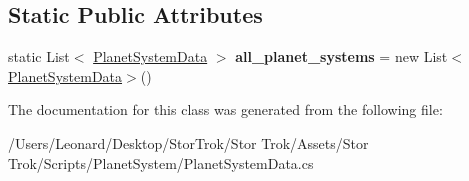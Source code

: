 \subsection*{Static Public Attributes}
\begin{DoxyCompactItemize}
\item 
\mbox{\label{class_planet_system_data_a4c27b6dcfdf71b0786a5c735cb0ed5c8}} 
static List$<$ \hyperlink{class_planet_system_data}{Planet\+System\+Data} $>$ {\bfseries all\+\_\+planet\+\_\+systems} = new List$<$\hyperlink{class_planet_system_data}{Planet\+System\+Data}$>$()
\end{DoxyCompactItemize}


The documentation for this class was generated from the following file\+:\begin{DoxyCompactItemize}
\item 
/\+Users/\+Leonard/\+Desktop/\+Stor\+Trok/\+Stor Trok/\+Assets/\+Stor Trok/\+Scripts/\+Planet\+System/Planet\+System\+Data.\+cs\end{DoxyCompactItemize}
